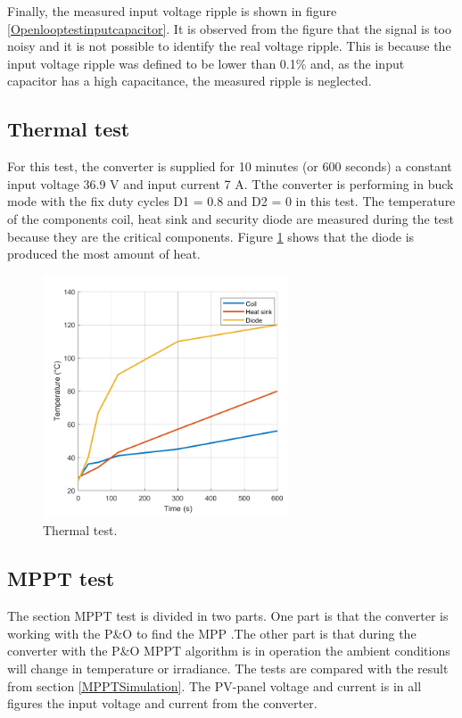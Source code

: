 Finally, the measured input voltage ripple is shown in figure \ref{Openlooptestinputcapacitor}. It is observed from the figure that the signal is too noisy and it is not possible to identify the real voltage ripple. This is because the input voltage ripple was defined to be lower than 0.1\% and, as the input capacitor has a high capacitance, the measured ripple is neglected. 

\subsection{Thermal test}

For this test, the converter is supplied for 10 minutes (or 600 seconds) a constant input voltage 36.9 V and input current 7 A. Tthe converter is performing in buck mode with the fix duty cycles D1 = 0.8 and D2 = 0 in this test. The temperature of the components coil, heat sink and security diode are measured during the test because they are the critical components. Figure \ref{Testthermal} shows that the diode is produced the most amount of heat.

\begin{figure}[H]
	\begin{center}
		\includegraphics[width=0.65\textwidth]{../Pictures/P1/Test/Thermal_test_with_heat_sink}
		\caption{Thermal test.}
		\label{Testthermal}
	\end{center}	
\end{figure}

\subsection{MPPT test}
The section MPPT test is divided in two parts. One part is that the converter is working with the P\&O to find the MPP .The other part is that during the converter with the P\&O MPPT algorithm is in operation the ambient conditions will change in temperature or irradiance. The tests are compared with the result from section \ref{MPPTSimulation}. The PV-panel voltage and current is in all figures the input voltage and current from the converter.

